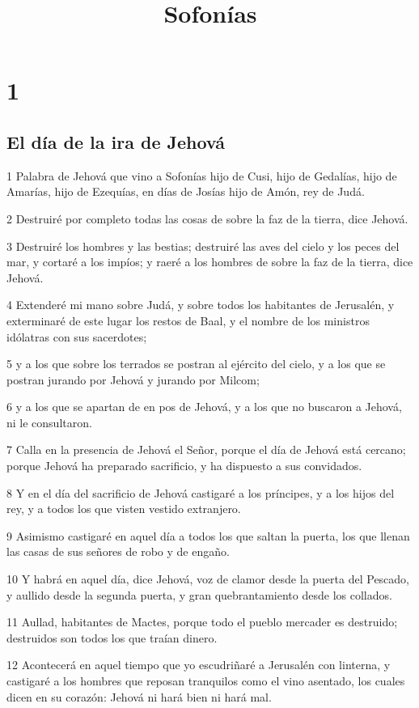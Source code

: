 

\title{Sofonías}

\chapter{1}

\section*{El día de la ira de Jehová}

\par 1 Palabra de Jehová que vino a Sofonías hijo de Cusi, hijo de Gedalías, hijo de Amarías, hijo de Ezequías, en días de Josías hijo de Amón, rey de Judá.
\par 2 Destruiré por completo todas las cosas de sobre la faz de la tierra, dice Jehová.
\par 3 Destruiré los hombres y las bestias; destruiré las aves del cielo y los peces del mar, y cortaré a los impíos; y raeré a los hombres de sobre la faz de la tierra, dice Jehová.
\par 4 Extenderé mi mano sobre Judá, y sobre todos los habitantes de Jerusalén, y exterminaré de este lugar los restos de Baal, y el nombre de los ministros idólatras con sus sacerdotes;
\par 5 y a los que sobre los terrados se postran al ejército del cielo, y a los que se postran jurando por Jehová y jurando por Milcom;
\par 6 y a los que se apartan de en pos de Jehová, y a los que no buscaron a Jehová, ni le consultaron.
\par 7 Calla en la presencia de Jehová el Señor, porque el día de Jehová está cercano; porque Jehová ha preparado sacrificio, y ha dispuesto a sus convidados.
\par 8 Y en el día del sacrificio de Jehová castigaré a los príncipes, y a los hijos del rey, y a todos los que visten vestido extranjero.
\par 9 Asimismo castigaré en aquel día a todos los que saltan la puerta, los que llenan las casas de sus señores de robo y de engaño.
\par 10 Y habrá en aquel día, dice Jehová, voz de clamor desde la puerta del Pescado, y aullido desde la segunda puerta, y gran quebrantamiento desde los collados.
\par 11 Aullad, habitantes de Mactes, porque todo el pueblo mercader es destruido; destruidos son todos los que traían dinero.
\par 12 Acontecerá en aquel tiempo que yo escudriñaré a Jerusalén con linterna, y castigaré a los hombres que reposan tranquilos como el vino asentado, los cuales dicen en su corazón: Jehová ni hará bien ni hará mal. 

